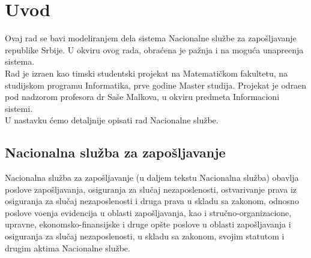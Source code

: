 \section{Uvod}

Ovaj rad se bavi modeliranjem dela sistema Nacionalne slu\v zbe za zapo\v sljavanje republike Srbije. U okviru ovog rada, obra\' cena je pa\v znja i na mogu\' ca unapre\dj enja sistema.\\

Rad je izra\dj en kao timski studentski projekat na Matemati\v ckom fakultetu, na studijskom programu Informatika, prve godine Master studija. Projekat je odra\dj en pod nadzorom profesora dr Sa\v se Malkova, u okviru predmeta Informacioni sistemi.\\

U nastavku \' cemo detaljnije opisati rad Nacionalne slu\v zbe.

\subsection{Nacionalna slu\v zba za zapo\v sljavanje}

Nacionalna slu\v zba za zapo\v sljavanje (u daljem tekstu Nacionalna slu\v zba) obavlja poslove zapo\v sljavanja, osiguranja za slu\v caj nezaposlenosti, ostvarivanje prava iz osiguranja za slu\v caj nezaposlenosti i druga prava u skladu sa zakonom, odnosno poslove vo\dj enja evidencija u oblasti zapo\v sljavanja, kao i stru\v cno-organi\-zacione, upravne, ekonomsko-finansijske i druge op\v ste poslove u oblasti zapo\v sljavanja i osiguranja za slu\v caj nezaposlenosti, u skladu sa zakonom, svojim statutom i drugim aktima Nacionalne slu\v zbe.

